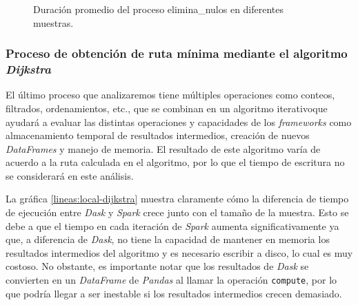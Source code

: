 \begin{figure}
\centering
{}
\caption{Duración promedio del proceso elimina\_nulos en diferentes muestras.}
\label{lineas:local-elimina-nulos}
\end{figure}

\subsubsection{Proceso de obtención de ruta mínima mediante el algoritmo \textit{Dijkstra}}

El último proceso que analizaremos tiene múltiples operaciones como conteos, filtrados, ordenamientos, etc., que se combinan en un algoritmo iterativoque ayudará a evaluar las distintas operaciones y capacidades de los \textit{frameworks} como almacenamiento temporal de resultados intermedios, creación de nuevos \textit{DataFrames} y manejo de memoria. El resultado de este algoritmo varía de acuerdo a la ruta calculada en el algoritmo, por lo que el tiempo de escritura no se considerará en este análisis.

La gráfica \ref{lineas:local-dijkstra} muestra claramente cómo la diferencia de tiempo de ejecución entre \textit{Dask} y \textit{Spark} crece junto con el tamaño de la muestra. Esto se debe a que el tiempo en cada iteración de \textit{Spark} aumenta significativamente ya que, a diferencia de \textit{Dask}, no tiene la capacidad de mantener en memoria los resultados intermedios del algoritmo y es necesario escribir a disco, lo cual es muy costoso. No obstante, es importante notar que los resultados de \textit{Dask} se convierten en un \textit{DataFrame} de \textit{Pandas} al llamar la operación \texttt{compute}, por lo que podría llegar a ser inestable si los resultados intermedios crecen demasiado.

